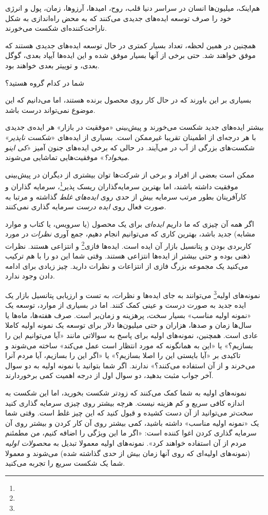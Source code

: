هم‌اینک، میلیون‌ها انسان در سراسر دنیا قلب، روح، امیدها، آرزوها، زمان،
پول و انرژی خود را صرف توسعه ایده‌های جدیدی می‌کنند که به محض راه‌اندازی
به شکل ناراحت‌کننده‌ای شکست می‌خورند.

همچنین در همین لحظه، تعداد بسیار کمتری در حال توسعه ایده‌های جدیدی هستند
که موفق خواهند شد. حتی برخی از آنها بسیار موفق شده و این ایده‌ها آیپاد
بعدی، گوگل بعدی، و توییتر بعدی خواهند بود.

شما در کدام گروه هستید؟

بسیاری بر این باورند که در حال کار روی محصول برنده هستند، اما می‌دانیم
که این موضوع نمی‌تواند درست باشد.

بیشتر ایده‌های جدید شکست می‌خورند و پیش‌بینی «موفقیت در بازار» هر ایده‌ی
جدیدی با هر درجه‌ای از اطمینان تقریبا غیرممکن است. بسیاری از ایده‌های
«\emph{شکست ناپذیر}» شکست‌های بزرگی از آب در می‌آیند. در حالی که برخی
ایده‌های جنون آمیز «\emph{کی اینو میخواد؟}» موفقیت‌هایی تماشایی می‌شوند.

ممکن است بعضی از افراد و برخی از شرکت‌ها توان بیشتری از دیگران در
پیش‌بینی موفقیت داشته باشند، اما بهترین سرمایه‌گذاران ریسک
پذیر\footnote{ }، سرمایه گذاران و کارآفرینان
بطور مرتب سرمایه بیش از حدی روی \emph{ایده‌های غلط} گذاشته و مرتبا به
صورت فعال روی \emph{ایده درست} سرمایه گذاری نمی‌کنند.

اگر همه آن چیزی که ما داریم \emph{ایده‌ای} برای یک محصول (یا سرویس، یا
کتاب و موارد مشابه) جدید باشد، بهترین کاری که می‌توانیم انجام دهیم، جمع
آوری \emph{نظرات} در مورد کاربردی بودن و پتانسیل بازار آن ایده است.
ایده‌ها فازی\footnote{} و انتزاعی هستند. نظرات ذهنی بوده و حتی
بیشتر از ایده‌ها انتزاعی هستند. وقتی شما این دو را با هم ترکیب می‌کنید
یک مجموعه بزرگ فازی از انتزاعات و نظرات دارید. چیز زیادی برای ادامه دادن
وجود ندارد.

نمونه‌های اولیه\footnote{} می‌توانند به جای ایده‌ها و
نظرات، به تست و ارزیابی پتانسیل بازار یک ایده جدید به صورت درست و عینی
کمک کنند. اما در بسیاری از موارد، توسعه یک «نمونه اولیه مناسب» بسیار
سخت، پرهزینه و زمان‌بر است. صرف هفته‌ها، ماه‌ها یا سال‌ها زمان و صدها،
هزاران و حتی میلیون‌ها دلار برای توسعه یک نمونه اولیه کاملا عادی است.
همچنین، نمونه‌های اولیه برای پاسخ به سوالاتی مانند «آیا می‌توانیم این را
بسازیم؟» یا «این به همانگونه که مورد انتظار است عمل می‌کند» ساخته
می‌شوند و تاکیدی بر «آیا بایستی این را اصلا بسازیم؟» یا «اگر این را
بسازیم، آیا مردم آنرا می‌خرند و از آن استفاده می‌کنند؟» ندارند. اگر شما
بتوانید با نمونه اولیه به دو سوال آخر جواب مثبت بدهید، دو سوال اول از
درجه اهمیت کمی برخوردارند.

نمونه‌های اولیه به شما کمک می‌کنند که زودتر شکست بخورید، اما این شکست به
اندازه کافی سریع و کم هزینه نیست. هرچه بیشتر روی چیزی سرمایه گذاری کنید
سخت‌تر می‌توانید از آن دست کشیده و قبول کنید که این چیز غلط است. وقتی
شما یک «نمونه اولیه مناسب» داشته باشید، کمی بیشتر روی آن کار کردن و
بیشتر روی آن سرمایه گذاری کردن اغوا کننده است: «اگر ما این ویژگی را
اضافه کنیم، من مطمئنم مردم از آن استفاده خواهند کرد». نمونه‌های اولیه
معمولا تبدیل به \emph{محصولات اولیه} (نمونه‌های اولیه‌ای که روی آنها
زمان بیش از حدی گذاشته شده) می‌شوند و معمولا شما یک شکست سریع را تجربه
می‌کنید.

